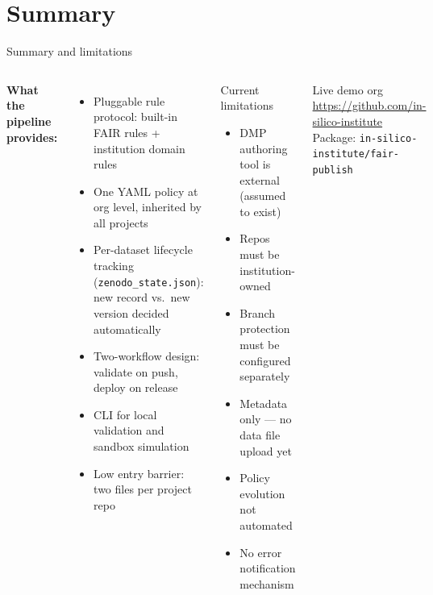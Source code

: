 \documentclass[aspectratio=169]{beamer}
\begin{document}
\section{Summary}

\begin{frame}[shrink=10]{Summary and limitations}
  \begin{columns}[T]
      \textbf{What the pipeline provides:}
      \begin{itemize}\setlength\itemsep{1pt}
        \item Pluggable rule protocol: built-in FAIR rules
              + institution domain rules
        \item One YAML policy at org level, inherited by all projects
        \item Per-dataset lifecycle tracking (\texttt{zenodo\_state.json}):\\
              new record vs.\ new version decided automatically
        \item Two-workflow design: validate on push,
              deploy on release
        \item CLI for local validation and sandbox simulation
        \item Low entry barrier: two files per project repo
      \end{itemize}

      \begin{alertblock}{Current limitations}
        \begin{itemize}\setlength\itemsep{2pt}
          \item DMP authoring tool is external (assumed to exist)
          \item Repos must be institution-owned
          \item Branch protection must be configured separately
          \item Metadata only --- no data file upload yet
          \item Policy evolution not automated
          \item No error notification mechanism
        \end{itemize}
      \end{alertblock}
      \vspace{0.1cm}
      \begin{block}{Live demo org}
        \footnotesize
        \url{https://github.com/in-silico-institute}\\[4pt]
        Package: \texttt{in-silico-institute/fair-publish}
      \end{block}
  \end{columns}
\end{frame}
\end{document}
